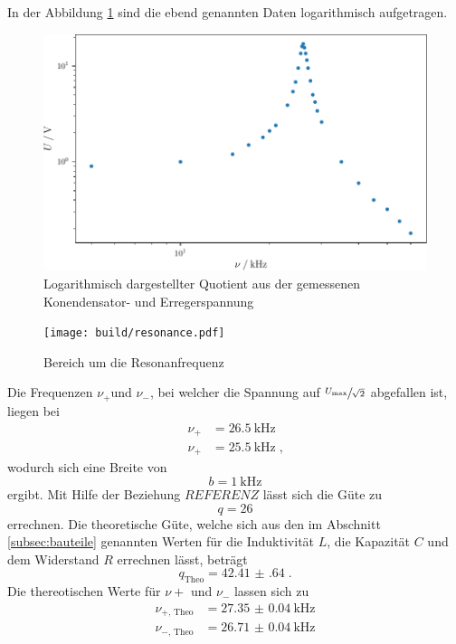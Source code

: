 In der Abbildung \ref{fig:frequence} sind die ebend genannten Daten logarithmisch aufgetragen.
\begin{figure}
    \centering
    \caption{Logarithmisch dargestellter Quotient aus der gemessenen Konendensator- und Erregerspannung}
    \label{fig:frequence}
    \includegraphics{build/frequence.pdf}
\end{figure}
\begin{figure}
    \centering
    \caption{Bereich um die Resonanfrequenz}
    \label{fig:resonance}
    \texttt{[image: build/resonance.pdf]}
\end{figure}
\noindent Die Frequenzen $\nu_+ $und $\nu_-$, bei welcher die Spannung auf $\sfrac{U_\text{max}}{\sqrt{2}}$ abgefallen ist, liegen bei
\begin{align*}
    \nu_+ &= \SI{26.5}{\kilo\hertz} \\
    \nu_+ &= \SI{25.5}{\kilo\hertz} \; \text{,}
\end{align*}
wodurch sich eine Breite von
\begin{equation*}
    b = \SI{1}{\kilo\hertz}
\end{equation*}
ergibt.
Mit Hilfe der Beziehung $REFERENZ$ lässt sich die Güte zu 
\begin{equation*}
    q = 26
\end{equation*}
errechnen.
Die theoretische Güte, welche sich aus den im Abschnitt \ref{subsec:bauteile} genannten Werten für die Induktivität $L$, 
die Kapazität $C$ und dem Widerstand $R$ errechnen lässt, beträgt 
\begin{equation*}
    q_\text{Theo} = \num{42.41(64)} \; \text{.}
\end{equation*}
Die thereotischen Werte für $\nu+ $ und $\nu_-$ lassen sich zu 
\begin{align*}
    \nu_{+\text{, Theo}} & = \SI{27.35(4)}{\kilo\hertz}\\
    \nu_{-\text{, Theo}} & = \SI{26.71(4)}{\kilo\hertz} 
\end{align*}
